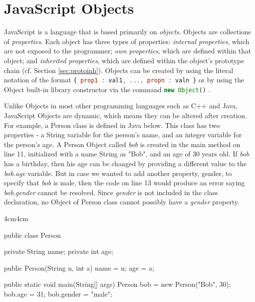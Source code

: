 \documentclass[a4paper,11pt,twoside]{report}
\def\jsinline{\lstinline[language=JavaScript, basicstyle=\small]}%\end{lstlisting}
\begin{document}
\section{JavaScript Objects}
JavaScript is a language that is based primarily on \emph{objects}. Objects are collections of \emph{properties}. Each object has three types of properties: \emph{internal properties}, which are not exposed to the programmer; \emph{own properties}, which are defined within that object; and \emph{inherited properties}, which are defined within the object's prototype chain (cf. Section \ref{sec:protoinh}). Objects can be created by using the literal notation of the format \jsinline|{ prop1 : val1, ..., propn : valn }| or by using the Object built-in library constructor via the command \jsinline|new Object()| \cite{EcmaScript}.


Unlike Objects in most other programming languages such as C++ and Java, JavaScript Objects are dynamic, which means they can be altered after creation. For example, a Person class is defined in Java below. This class has two properties - a String variable for the person's name, and an integer variable for the person's age. A Person Object called \textit{bob} is created in the main method on line 11, initialized with a name String as "Bob", and an age of 30 years old. If \textit{bob} has a birthday, then his age can be changed by providing a different value to the \textit{bob.age} variable. But in case we wanted to add another property, gender, to specify that \textit{bob} is male, then the code on line 13 would produce an error saying \textit{bob.gender} cannot be resolved. Since \textit{gender} is not included in the class declaration, no Object of Person class cannot possibly have a \textit{gender} property.

\begin{adjustwidth}{4cm}{4cm}
\begin{lstjs}
public class Person {
    private String name;
    private int age;
    
    public Person(String n, int a) {
        name = n;
        age = a;
    }
    
    public static void main(String[] args) {
        Person bob = new Person("Bob", 30);
        bob.age = 31;
        bob.gender = "male";
    }
}
\end{lstjs}
\end{adjustwidth}
\end{document}
